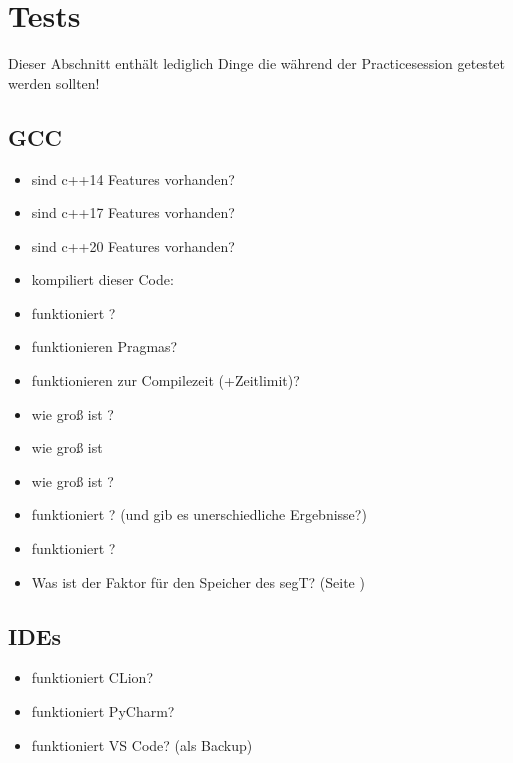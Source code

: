 \section{Tests}
Dieser Abschnitt enthält lediglich Dinge die während der Practicesession getestet werden sollten!

\subsection{GCC}
\begin{itemize}
	\item sind c++14 Features vorhanden?
	\item sind c++17 Features vorhanden?
	\item sind c++20 Features vorhanden?
	\item kompiliert dieser Code:
\end{itemize}
\begin{itemize}
	\item funktioniert ?
	\item funktionieren Pragmas?
	\item funktionieren  zur Compilezeit (+Zeitlimit)?
	\item wie groß ist ?
	\item wie groß ist \code
	\item wie groß ist ?
	\item funktioniert ? (und gib es unerschiedliche Ergebnisse?)
	\item funktioniert ?
	\item Was ist der Faktor für den Speicher des segT? (Seite \pageref{segT})
\end{itemize}


\subsection{IDEs}
\begin{itemize}
	\item funktioniert CLion?
	\item funktioniert PyCharm?
	\item funktioniert VS Code? (als Backup)
\end{itemize}

